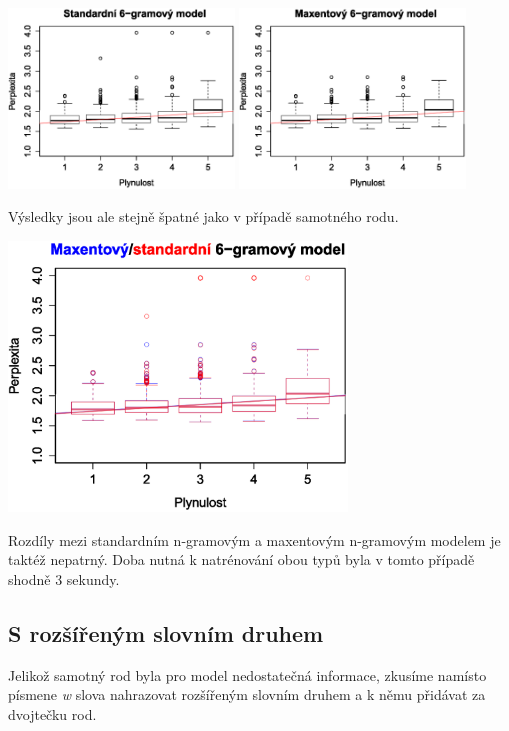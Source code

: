 \documentclass[12pt,a4paper]{report}
\begin{document}
\begin{center}
	\includegraphics[width=60mm]{./grafy/morf/ngram/rodstejny.eps}
	\includegraphics[width=60mm]{./grafy/morf/maxent/rodstejny.eps}
\end{center}
Výsledky jsou ale stejně špatné jako v případě samotného rodu.
\begin{center}
	\includegraphics[width=90mm]{./grafy/morf/porovnani/rodstejny.eps}	
\end{center}
Rozdíly mezi standardním n-gramovým a maxentovým n-gramovým modelem je taktéž nepatrný. Doba nutná k natrénování obou typů byla v tomto případě shodně 3 sekundy.

\subsection{S rozšířeným slovním druhem}
Jelikož samotný rod byla pro model nedostatečná informace, zkusíme namísto písmene \textit{w} slova nahrazovat rozšířeným slovním druhem a k němu přidávat za dvojtečku rod.
\end{document}
